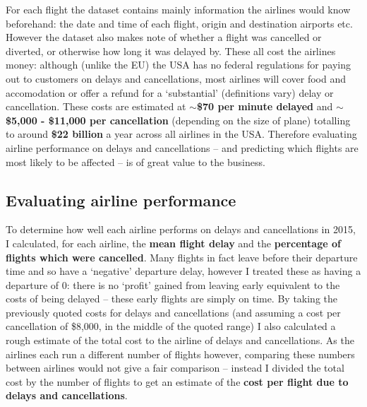 \documentclass[a4paper]{article}
\begin{document}
For each flight the dataset contains mainly information the airlines would know beforehand: the date and time of each flight, origin and destination airports etc. However the dataset also makes note of whether a flight was cancelled or diverted, or otherwise how long it was delayed by. These all cost the airlines money: although (unlike the EU) the USA has no federal regulations for paying out to customers on delays and cancellations,  most airlines will cover food and accomodation or offer a refund for a `substantial' (definitions vary) delay or cancellation.\footnotemark[1] These costs are estimated at \textbf{${\sim}$\$70 per minute delayed} and \textbf{${\sim}$\$5,000 - \$11,000 per cancellation} (depending on the size of plane) totalling to around \textbf{\$22 billion} a year across all airlines in the USA\footnotemark[2]. Therefore evaluating airline performance on delays and cancellations -- and predicting which flights are most likely to be affected -- is of great value to the business.

\subsection*{Evaluating airline performance}
To determine how well each airline performs on delays and cancellations in 2015, I calculated, for each airline, the {\bf mean flight delay} and the {\bf percentage of flights which were cancelled}. Many flights in fact leave before their departure time and so have a `negative' departure delay, however I treated these as having a departure of 0: there is no `profit' gained from leaving early equivalent to the costs of being delayed -- these early flights are simply on time. By taking the previously quoted costs for delays and cancellations (and assuming a cost per cancellation of \$8,000, in the middle of the quoted range) I also calculated a rough estimate of the total cost to the airline of delays and cancellations. As the airlines each run a different number of flights however, comparing these numbers between airlines would not give a fair comparison -- instead I divided the total cost by the number of flights to get an estimate of the {\bf cost per flight due to delays and cancellations}.
\end{document}
